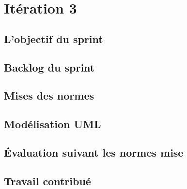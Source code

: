 \section{Itération 3}

\subsection{L'objectif du sprint}
\subsection{Backlog du sprint}
\subsection{Mises des normes}
\subsection{Modélisation UML}
\subsection{Évaluation suivant les normes mise}
\subsection{Travail contribué}

